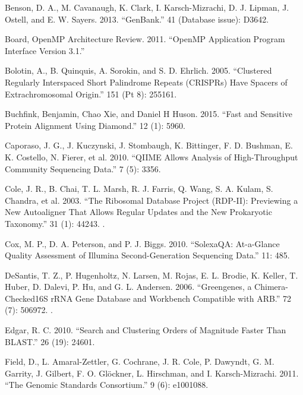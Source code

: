\documentclass[letterpaper,10pt,english]{sphinxmanual}
\begin{document}
Benson, D. A., M. Cavanaugh, K. Clark, I. Karsch-Mizrachi, D. J.
Lipman, J. Ostell, and E. W. Sayers. 2013. “GenBank.”  41 (Database issue): D36\textendash{}42.

Board, OpenMP Architecture Review. 2011. “OpenMP Application
Program Interface Version 3.1.”

Bolotin, A., B. Quinquis, A. Sorokin, and S. D. Ehrlich. 2005.
“Clustered Regularly Interspaced Short Palindrome Repeats
(CRISPRs) Have Spacers of Extrachromosomal Origin.” 
151 (Pt 8): 2551\textendash{}61.

Buchfink, Benjamin, Chao Xie, and Daniel H Huson. 2015. “Fast and
Sensitive Protein Alignment Using Diamond.”  12
(1): 59\textendash{}60.

Caporaso, J. G., J. Kuczynski, J. Stombaugh, K. Bittinger, F. D.
Bushman, E. K. Costello, N. Fierer, et al. 2010. “QIIME Allows
Analysis of High-Throughput Community Sequencing Data.”  7 (5): 335\textendash{}6.

Cole, J. R., B. Chai, T. L. Marsh, R. J. Farris, Q. Wang, S. A.
Kulam, S. Chandra, et al. 2003. “The Ribosomal Database Project
(RDP-II): Previewing a New Autoaligner That Allows Regular Updates
and the New Prokaryotic Taxonomy.”  31
(1): 442\textendash{}43. .

Cox, M. P., D. A. Peterson, and P. J. Biggs. 2010. “SolexaQA:
At-a-Glance Quality Assessment of Illumina Second-Generation
Sequencing Data.”  11: 485.

DeSantis, T. Z., P. Hugenholtz, N. Larsen, M. Rojas, E. L. Brodie,
K. Keller, T. Huber, D. Dalevi, P. Hu, and G. L. Andersen. 2006.
“Greengenes, a Chimera-Checked16S rRNA Gene Database and Workbench
Compatible with ARB.”  72 (7): 5069\textendash{}72.
.

Edgar, R. C. 2010. “Search and Clustering Orders of Magnitude
Faster Than BLAST.”  26 (19): 2460\textendash{}1.

Field, D., L. Amaral-Zettler, G. Cochrane, J. R. Cole, P. Dawyndt,
G. M. Garrity, J. Gilbert, F. O. Glöckner, L. Hirschman, and I.
Karsch-Mizrachi. 2011. “The Genomic Standards Consortium.”  9 (6): e1001088.
\end{document}
